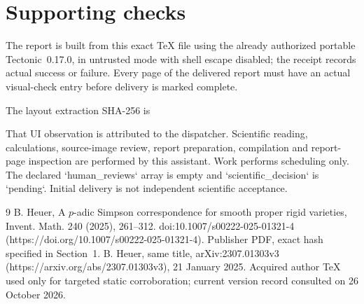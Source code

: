 \documentclass[10pt]{article}
\begin{document}
\section*{Supporting checks}
The report is built from this exact TeX file using the already authorized portable Tectonic 0.17.0, in untrusted mode with shell escape disabled; the receipt records actual success or failure. Every page of the delivered report must have an actual visual-check entry before delivery is marked complete.\par
The layout extraction SHA-256 is\par
That UI observation is attributed to the dispatcher. Scientific reading, calculations, source-image review, report preparation, compilation and report-page inspection are performed by this assistant. Work performs scheduling only. The declared `human\_reviews` array is empty and `scientific\_decision` is `pending`. Initial delivery is not independent scientific acceptance.\par
9 B. Heuer, A \(p\)-adic Simpson correspondence for smooth proper rigid varieties, Invent. Math. 240 (2025), 261–312. doi:10.1007/s00222-025-01321-4 (https://doi.org/10.1007/s00222-025-01321-4). Publisher PDF, exact hash specified in Section 1. B. Heuer, same title, arXiv:2307.01303v3 (https://arxiv.org/abs/2307.01303v3), 21 January 2025. Acquired author TeX used only for targeted static corroboration; current version record consulted on 26 October 2026.\par
\end{document}
